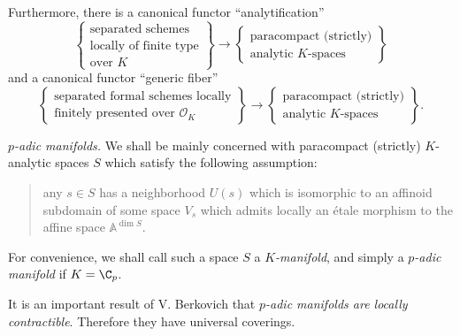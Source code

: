 \begin{para}
 
 Furthermore, there is a canonical functor ``analytification''
 \begin{equation*}
  \left\{
  \begin{matrix}
   \text{separated schemes}\\
   \text{locally of finite type}\\
   \text{over $K$}
  \end{matrix}
  \right\}
  \rightarrow
  \left\{
  \begin{matrix}
   \text{paracompact (strictly)}\\
   \text{analytic $K$-spaces}
  \end{matrix}
  \right\}
 \end{equation*}
 \noindent
 and a canonical functor ``generic fiber''
 \begin{equation*}
  \left\{
  \begin{matrix}
   \text{separated formal schemes locally}\\
   \text{finitely presented over $\mathcal{O}_K$}
  \end{matrix}
  \right\}
  \rightarrow
  \left\{
  \begin{matrix}
   \text{paracompact (strictly)}\\
   \text{analytic $K$-spaces}
  \end{matrix}
  \right\}.
 \end{equation*}
\end{para}

\begin{para}\label{para:p-adic-manifold}
 {\itshape $p$-adic manifolds.} We shall be mainly 
 concerned with paracompact (strictly) $K$-analytic spaces $S$ which
 satisfy the following assumption:
 \begin{quote}
  any $s\in S$ has a neighborhood $U(s)$ which is isomorphic 
  to an affinoid subdomain of some space
  $V_s$ which admits locally an \'etale morphism to the affine space 
  $\mathbb{A}^{\dim S}$.
 \end{quote}
 For convenience, we shall call such a space $S$ a {\it
 $K$-manifold}, and simply 
 a {\it $p$-adic manifold} if $K=\C_p$.

 \noindent It is an important result of V. Berkovich \cite{spasalc}
 that \emph{$p$-adic manifolds are locally contractible}.  Therefore
 they have universal coverings. 
\end{para}

